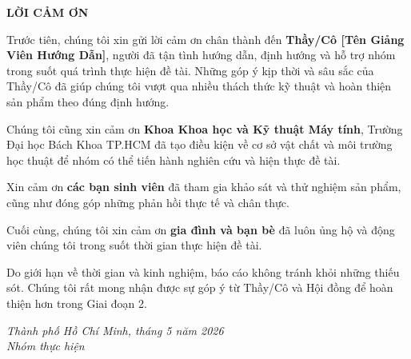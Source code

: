 \thispagestyle{empty}
\begin{center}
    \textbf{\Large LỜI CẢM ƠN}
\end{center}

\vspace{1cm}

Trước tiên, chúng tôi xin gửi lời cảm ơn chân thành đến \textbf{Thầy/Cô
[Tên Giảng Viên Hướng Dẫn]}, người đã tận tình hướng dẫn, định hướng và hỗ
trợ nhóm trong suốt quá trình thực hiện đề tài. Những góp ý kịp thời và sâu
sắc của Thầy/Cô đã giúp chúng tôi vượt qua nhiều thách thức kỹ thuật và hoàn
thiện sản phẩm theo đúng định hướng.

Chúng tôi cũng xin cảm ơn \textbf{Khoa Khoa học và Kỹ thuật Máy tính},
Trường Đại học Bách Khoa TP.HCM đã tạo điều kiện về cơ sở vật chất và môi
trường học thuật để nhóm có thể tiến hành nghiên cứu và hiện thực đề tài.

Xin cảm ơn \textbf{các bạn sinh viên} đã tham gia khảo sát và thử nghiệm
sản phẩm, cũng như đóng góp những phản hồi thực tế và chân thực.

Cuối cùng, chúng tôi xin cảm ơn \textbf{gia đình và bạn bè} đã luôn ủng hộ
và động viên chúng tôi trong suốt thời gian thực hiện đề tài.

Do giới hạn về thời gian và kinh nghiệm, báo cáo không tránh khỏi những thiếu
sót. Chúng tôi rất mong nhận được sự góp ý từ Thầy/Cô và Hội đồng để hoàn
thiện hơn trong Giai đoạn 2.

\vspace{1.5cm}

\begin{flushright}
    \textit{Thành phố Hồ Chí Minh, tháng 5 năm 2026}\\[0.5cm]
    \textit{Nhóm thực hiện}
\end{flushright}
